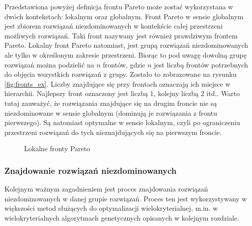 \documentclass[twoside]{iisthesis}
\begin{document}
Przedstawiona powyżej definicja frontu Pareto może zostać wykorzystana w dwóch kontekstach: lokalnym oraz globalnym. Front Pareto w sensie globalnym jest zbiorem rozwiązań niezdominowanych w kontekście całej przestrzeni możliwych rozwiązań. Taki front nazywany jest również prawdziwym frontem Pareto. Lokalny front Pareto natomiast, jest grupą rozwiązań niezdominowanych ale tylko w określonym zakresie przestrzeni. Biorąc to pod uwagę dowolną grupę rozwiązań można podzielić na $n$ frontów, gdzie $n$ jest liczbą frontów potrzebnych do objęcia wszystkich rozwiązań z grupy. Zostało to zobrazowane na rysunku \eqref{fig:fronts_ex}. Liczby znajdujące się przy frontach oznaczają ich miejsce w hierarchii. Najlepszy front oznaczony jest liczbą 1, kolejny liczbą 2 itd.. Warto tutaj zauważyć, że rozwiązania znajdujące się na drugim froncie nie są niezdominowane w sensie globalnym (dominują je rozwiązania z frontu pierwszego). Są natomiast optymalne w sensie lokalnym, czyli po ograniczeniu przestrzeni rozwiązań do tych nieznajdujących się na pierwszym froncie.
\begin{figure}[!htb]
	\centering
	\caption{Lokalne fronty Pareto}
	\label{fig:fronts_ex}
\end{figure}
\subsubsection{Znajdowanie rozwiązań niezdominowanych}
Kolejnym ważnym zagadnieniem jest proces znajdowania rozwiązań niezdominowanych w danej grupie rozwiązań. Proces ten jest wykorzystywany w większości metod służących do optymalizacji wielokryterialnej, m.in. w wielokryterialnych algorytmach genetycznych opisanych w kolejnym rozdziale.
\end{document}
